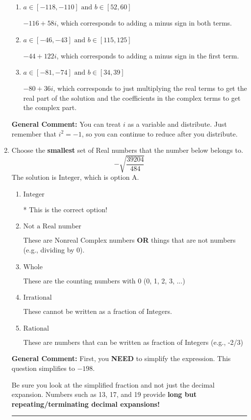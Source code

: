 \documentclass{extbook}[14pt]
\newcommand{\litem}[1]{\item #1

\rule{\textwidth}{0.4pt}}
\begin{document}
\begin{enumerate}
{\begin{enumerate}[label=\Alph*.]
 $-44 - 122 i$, which corresponds to adding a minus sign in the second term.
\item \( a \in [-118, -110] \text{ and } b \in [52, 60] \)

 $-116 + 58 i$, which corresponds to adding a minus sign in both terms.
\item \( a \in [-46, -43] \text{ and } b \in [115, 125] \)

 $-44 + 122 i$, which corresponds to adding a minus sign in the first term.
\item \( a \in [-81, -74] \text{ and } b \in [34, 39] \)

 $-80 + 36 i$, which corresponds to just multiplying the real terms to get the real part of the solution and the coefficients in the complex terms to get the complex part.
\end{enumerate}

\textbf{General Comment:} You can treat $i$ as a variable and distribute. Just remember that $i^2=-1$, so you can continue to reduce after you distribute.
}
\litem{
Choose the \textbf{smallest} set of Real numbers that the number below belongs to.
\[ -\sqrt{\frac{39204}{484}} \]The solution is \( \text{Integer} \), which is option A.\begin{enumerate}[label=\Alph*.]
\item \( \text{Integer} \)

* This is the correct option!
\item \( \text{Not a Real number} \)

These are Nonreal Complex numbers \textbf{OR} things that are not numbers (e.g., dividing by 0).
\item \( \text{Whole} \)

These are the counting numbers with 0 (0, 1, 2, 3, ...)
\item \( \text{Irrational} \)

These cannot be written as a fraction of Integers.
\item \( \text{Rational} \)

These are numbers that can be written as fraction of Integers (e.g., -2/3)
\end{enumerate}

\textbf{General Comment:} First, you \textbf{NEED} to simplify the expression. This question simplifies to $-198$. 
 
 Be sure you look at the simplified fraction and not just the decimal expansion. Numbers such as 13, 17, and 19 provide \textbf{long but repeating/terminating decimal expansions!} 
 
}
\end{enumerate}
\end{document}
